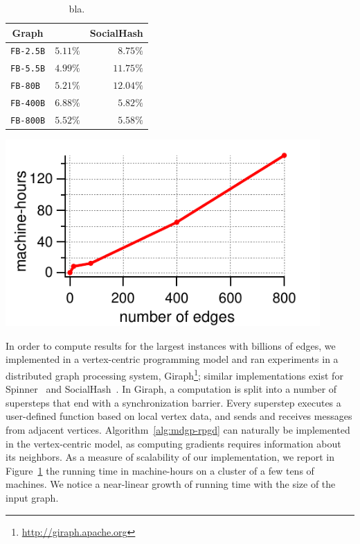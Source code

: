 \begin{table}[ht]
	\begin{minipage}[b]{0.5\linewidth}
		\centering
		\begin{tabular}{lrr}
			\toprule
			\multicolumn{1}{c}{Graph} & \multicolumn{1}{c}{\algnameshort} %
			& \multicolumn{1}{c}{SocialHash} \\
			\midrule
			\texttt{FB-2.5B}
			& $\boldsymbol{5.11\%}$ & $8.75\%$ \\
			\texttt{FB-5.5B}
			& $\boldsymbol{4.99\%}$  & $11.75\%$ \\
			\texttt{FB-80B}
			& $\boldsymbol{5.21\%}$  & $12.04\%$ \\
			\texttt{FB-400B}
			& $6.88\%$  & $\boldsymbol{5.82\%}$ \\
			\texttt{FB-800B}
			& $\boldsymbol{5.52\%}$  & $5.58\%$ \\
			\bottomrule
		\end{tabular}
		\vspace{0.3cm}
		\caption{bla.}
		\label{table:qualityFB}
	\end{minipage}\hfill
	\begin{minipage}[b]{0.48\linewidth}
		\centering
		\includegraphics[width=0.9\textwidth]{pics/mt}
		\vspace{0.05cm}
		\label{fig:mh}
	\end{minipage}
\end{table}

In order to compute results for the largest instances with billions of edges, we implemented \algnameshort in a
vertex-centric programming model and ran experiments in a distributed graph processing system, Giraph\footnote{\url{http://giraph.apache.org}}; similar
implementations exist for Spinner~\cite{MLLS17} and SocialHash~\cite{KKPPSAP17}.
In Giraph, a computation is split into a number of supersteps that end with a synchronization barrier.
Every superstep executes a user-defined function based on local vertex data, and sends and receives
messages from adjacent vertices. Algorithm~\ref{alg:mdgp-rpgd} can naturally be implemented in the
vertex-centric model, as computing gradients requires information about its neighbors.
As a measure of scalability of our implementation, we report in Figure~\ref{fig:mh} the running time in machine-hours
on a cluster of a few tens of machines. We notice a near-linear growth of running time with the size of the input graph.

